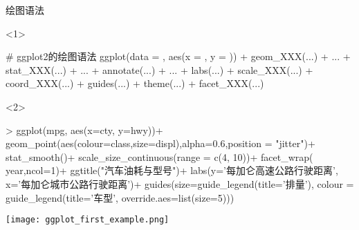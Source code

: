 \begin{frame}[t,fragile]{\subsecname}{绘图语法}
\begin{overlayarea}{\textwidth}{\textheight}
\begin{onlyenv}<1>
\begin{rcode}
# ggplot2的绘图语法 
ggplot(data = , aes(x = , y = )) + geom_XXX(...) + ... + stat_XXX(...) + ... + annotate(...) + ... + labs(...) + scale_XXX(...) + coord_XXX(...) + guides(...) + theme(...) + facet_XXX(...)
\end{rcode}
\end{onlyenv}

\begin{onlyenv}<2>
\begin{minipage}{\textwidth}
\begin{rcode}
> ggplot(mpg, aes(x=cty, y=hwy))+   
  geom_point(aes(colour=class,size=displ),alpha=0.6,position = "jitter")+  
  stat_smooth()+  
  scale_size_continuous(range = c(4, 10))+  
  facet_wrap(~ year,ncol=1)+  
  ggtitle("汽车油耗与型号")+  
  labs(y='每加仑高速公路行驶距离',  
       x='每加仑城市公路行驶距离')+  
  guides(size=guide_legend(title='排量'), colour = guide_legend(title='车型', override.aes=list(size=5))) 
\end{rcode} 
\end{minipage}

\begin{minipage}{\textwidth}
\centering
\texttt{[image: ggplot\_first\_example.png]}
\end{minipage}
\end{onlyenv}
\end{overlayarea}
\end{frame}


